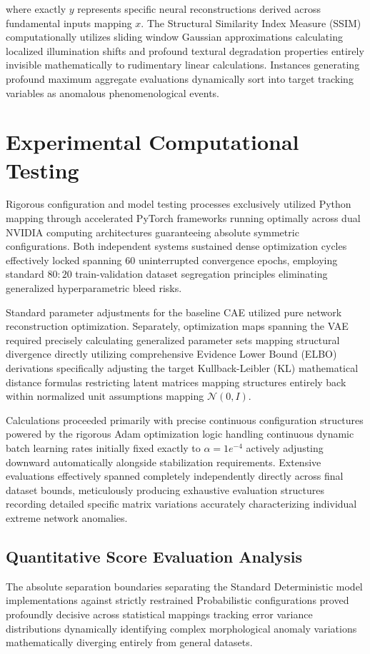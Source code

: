 \documentclass[conference]{IEEEtran}
\begin{document}
where exactly $y$ represents specific neural reconstructions derived across fundamental inputs mapping $x$. The Structural Similarity Index Measure (SSIM) \cite{Wang2004} computationally utilizes sliding window Gaussian approximations calculating localized illumination shifts and profound textural degradation properties entirely invisible mathematically to rudimentary linear calculations. Instances generating profound maximum aggregate evaluations dynamically sort into target tracking variables as anomalous phenomenological events.

\section{Experimental Computational Testing}
Rigorous configuration and model testing processes exclusively utilized Python mapping through accelerated PyTorch frameworks running optimally across dual NVIDIA computing architectures guaranteeing absolute symmetric configurations. Both independent systems sustained dense optimization cycles effectively locked spanning 60 uninterrupted convergence epochs, employing standard $80:20$ train-validation dataset segregation principles eliminating generalized hyperparametric bleed risks. 

Standard parameter adjustments for the baseline CAE utilized pure network reconstruction optimization. Separately, optimization maps spanning the VAE required precisely calculating generalized parameter sets mapping structural divergence directly utilizing comprehensive Evidence Lower Bound (ELBO) derivations specifically adjusting the target Kullback-Leibler (KL) mathematical distance formulas restricting latent matrices mapping structures entirely back within normalized unit assumptions mapping $\mathcal{N}(0, I)$. 

Calculations proceeded primarily with precise continuous configuration structures powered by the rigorous Adam optimization logic handling continuous dynamic batch learning rates initially fixed exactly to $\alpha=1e^{-4}$ actively adjusting downward automatically alongside stabilization requirements. Extensive evaluations effectively spanned completely independently directly across final dataset bounds, meticulously producing exhaustive evaluation structures recording detailed specific matrix variations accurately characterizing individual extreme network anomalies.


\subsection{Quantitative Score Evaluation Analysis}
The absolute separation boundaries separating the Standard Deterministic model implementations against strictly restrained Probabilistic configurations proved profoundly decisive across statistical mappings tracking error variance distributions dynamically identifying complex morphological anomaly variations mathematically diverging entirely from general datasets.
\end{document}
